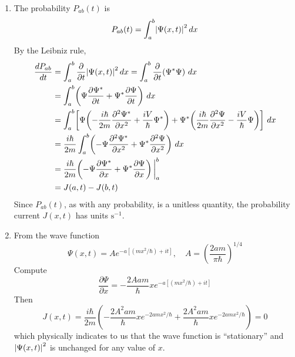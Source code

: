 \documentclass[a4paper]{article}
\begin{document}
\begin{enumerate}[label=(\alph*)]
	\item The probability \( P_{ab}\!\left( t \right) \) is 
	\[
		P_{ab}\!\left( t \right) = \int^{b}_{a} \abs{\Psi \!\left( x,t \right)}^{2} \, dx  
	\]
	By the Leibniz rule,
	\begin{align*}
		\frac{d P_{ab}}{d t} & = \int^{b}_{a} \frac{\partial }{\partial t}\abs{\Psi \!\left( x,t \right)}^{2} \, dx = \int^{b}_{a} \frac{\partial }{\partial t}\!\left( \Psi^{*}\Psi \right) \, dx \\
				     & = \int^{b}_{a} \!\left( \Psi \frac{\partial \Psi^{*}}{\partial t} + \Psi^{*}\frac{\partial \Psi}{\partial t} \right) \, dx \\
				     & = \int^{b}_{a} \!\left[ \Psi \!\left( -\frac{i \hbar}{2m}\frac{\partial^2 \Psi^{*}}{\partial x^2} + \frac{iV}{\hbar}\Psi^{*} \right) + \Psi^{*}\!\left( \frac{i \hbar}{2m}\frac{\partial^2 \Psi}{\partial x^2} - \frac{iV}{\hbar}\Psi \right)  \right] \, dx \\
				     & = \frac{i \hbar}{2m}\int^{b}_{a} \!\left( -\Psi \frac{\partial^2 \Psi^{*}}{\partial x^2} + \Psi^{*}\frac{\partial^2 \Psi}{\partial x^2} \right) \, dx \\
				     & = \frac{i \hbar}{2m}\!\left( -\Psi \frac{\partial \Psi^{*}}{\partial x} + \Psi^{*}\frac{\partial \Psi}{\partial x} \right)\bigg|^{b}_{a} \\
				     & = J \!\left( a,t \right) - J \!\left( b,t \right)
	\end{align*}
	Since \( P_{ab}\!\left( t \right) \), as with any probability, is a unitless quantity, the probability current \( J \!\left( x,t \right) \) has units \( \text{s}^{-1} \). 
	\item From the wave function
	\[
		\Psi \!\left( x,t \right) = Ae^{-a \!\left[ \!\left( mx^{2} / \hbar \right) + it \right]}, \quad A = \!\left( \frac{2am}{\pi \hbar} \right)^{1/4}
	\]
	Compute
	\[
		\frac{\partial \Psi}{\partial x} = -\frac{2Aam}{\hbar}xe^{-a \!\left[ \!\left( mx^{2}/\hbar \right) + it \right]}
	\]
	Then
	\[
		J \!\left( x,t \right) = \frac{i \hbar}{2m}\!\left( -\frac{2A^{2}am}{\hbar}xe^{-2amx^{2}/\hbar} + \frac{2A^{2}am}{\hbar}xe^{-2amx^{2}/\hbar} \right) = 0
	\]
	which physically indicates to us that the wave function is ``stationary'' and \( \abs{\Psi \!\left( x,t \right)}^{2} \) is unchanged for any value of \( x \).
\end{enumerate}
\end{document}
